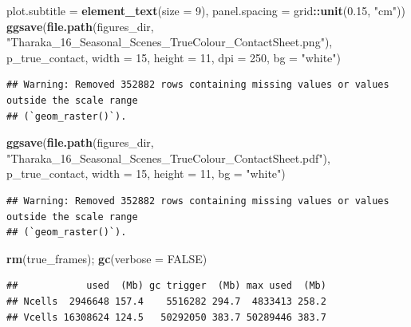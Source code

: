 \documentclass[
]{article}
\newenvironment{Shaded}{\begin{snugshade}}{\end{snugshade}}
\newcommand{\AttributeTok}[1]{\textcolor[rgb]{0.13,0.29,0.53}{#1}}
\newcommand{\ConstantTok}[1]{\textcolor[rgb]{0.56,0.35,0.01}{#1}}
\newcommand{\DecValTok}[1]{\textcolor[rgb]{0.00,0.00,0.81}{#1}}
\newcommand{\FloatTok}[1]{\textcolor[rgb]{0.00,0.00,0.81}{#1}}
\newcommand{\FunctionTok}[1]{\textcolor[rgb]{0.13,0.29,0.53}{\textbf{#1}}}
\newcommand{\NormalTok}[1]{#1}
\newcommand{\SpecialCharTok}[1]{\textcolor[rgb]{0.81,0.36,0.00}{\textbf{#1}}}
\newcommand{\StringTok}[1]{\textcolor[rgb]{0.31,0.60,0.02}{#1}}
\begin{document}
\begin{Shaded}
\begin{Highlighting}[]
        \AttributeTok{plot.subtitle =} \FunctionTok{element\_text}\NormalTok{(}\AttributeTok{size =} \DecValTok{9}\NormalTok{), }\AttributeTok{panel.spacing =}\NormalTok{ grid}\SpecialCharTok{::}\FunctionTok{unit}\NormalTok{(}\FloatTok{0.15}\NormalTok{, }\StringTok{"cm"}\NormalTok{))}
\FunctionTok{ggsave}\NormalTok{(}\FunctionTok{file.path}\NormalTok{(figures\_dir, }\StringTok{"Tharaka\_16\_Seasonal\_Scenes\_TrueColour\_ContactSheet.png"}\NormalTok{), p\_true\_contact, }\AttributeTok{width =} \DecValTok{15}\NormalTok{, }\AttributeTok{height =} \DecValTok{11}\NormalTok{, }\AttributeTok{dpi =} \DecValTok{250}\NormalTok{, }\AttributeTok{bg =} \StringTok{"white"}\NormalTok{)}
\end{Highlighting}
\end{Shaded}

\begin{verbatim}
## Warning: Removed 352882 rows containing missing values or values outside the scale range
## (`geom_raster()`).
\end{verbatim}

\begin{Shaded}
\begin{Highlighting}[]
\FunctionTok{ggsave}\NormalTok{(}\FunctionTok{file.path}\NormalTok{(figures\_dir, }\StringTok{"Tharaka\_16\_Seasonal\_Scenes\_TrueColour\_ContactSheet.pdf"}\NormalTok{), p\_true\_contact, }\AttributeTok{width =} \DecValTok{15}\NormalTok{, }\AttributeTok{height =} \DecValTok{11}\NormalTok{, }\AttributeTok{bg =} \StringTok{"white"}\NormalTok{)}
\end{Highlighting}
\end{Shaded}

\begin{verbatim}
## Warning: Removed 352882 rows containing missing values or values outside the scale range
## (`geom_raster()`).
\end{verbatim}

\begin{Shaded}
\begin{Highlighting}[]
\FunctionTok{rm}\NormalTok{(true\_frames); }\FunctionTok{gc}\NormalTok{(}\AttributeTok{verbose =} \ConstantTok{FALSE}\NormalTok{)}
\end{Highlighting}
\end{Shaded}

\begin{verbatim}
##            used  (Mb) gc trigger  (Mb) max used  (Mb)
## Ncells  2946648 157.4    5516282 294.7  4833413 258.2
## Vcells 16308624 124.5   50292050 383.7 50289446 383.7
\end{verbatim}
\end{document}
